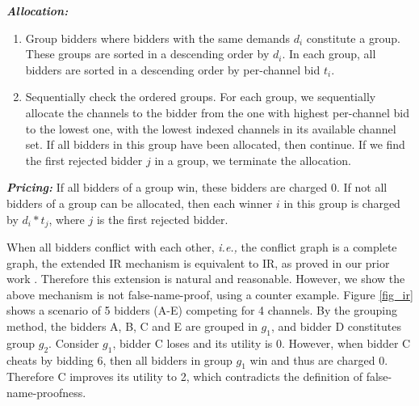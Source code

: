 \documentclass{sig-alternate}
\begin{document}




\emph{\textbf{Allocation:}}

\begin{enumerate}
\item Group bidders where bidders with the same demands $d_i$ constitute a group. These groups are sorted in a descending order by $d_i$. In each group, all bidders are sorted in a descending order by per-channel bid $t_i$.
\item Sequentially check the ordered groups. For each group, we sequentially allocate the channels to the bidder from the one with highest per-channel bid to the lowest one, with the lowest indexed channels in its available channel set. If all bidders in this group have been allocated, then continue. If we find the first rejected bidder $j$ in a group, we terminate the allocation.
\end{enumerate}

\emph{\textbf{Pricing:}} If all bidders of a group win, these bidders are charged 0. If not all bidders of a group can be allocated, then each winner $i$ in this group is charged by $d_i*t_j$, where $j$ is the first rejected bidder.




When all bidders conflict with each other, \emph{i.e.,} the conflict graph is a complete graph, the extended IR mechanism is equivalent to IR, as proved in our prior work \cite{Wang:Info:15}. Therefore this extension is natural and reasonable. However, we show the above mechanism is not false-name-proof, using a counter example. Figure \ref{fig_ir} shows a scenario of 5 bidders (A-E) competing for 4 channels. By the grouping method, the bidders A, B, C and E are grouped in $g_1$, and bidder D constitutes group $g_2$. Consider $g_1$, bidder C loses and its utility is 0. However, when bidder C cheats by bidding 6, then all bidders in group $g_1$ win and thus are charged 0. Therefore C improves its utility to 2, which contradicts the definition of false-name-proofness.
\end{document}
